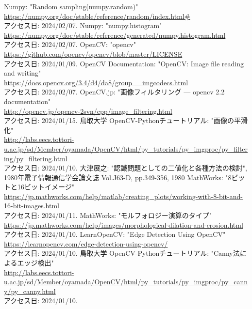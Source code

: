 \documentclass[uplatex, report, a4j, 10pt]{jsbook}
\begin{document}
\begin{thebibliography}{0}
  Numpy: "Random sampling(numpy.random)"\\\url{https://numpy.org/doc/stable/reference/random/index.html#}\\アクセス日: 2024/02/07.
  Numpy: "numpy.histogram"\\\url{https://numpy.org/doc/stable/reference/generated/numpy.histogram.html}\\アクセス日: 2024/02/07.
  OpenCV: "opencv"\\\url{https://github.com/opencv/opencv/blob/master/LICENSE}\\アクセス日: 2024/01/09.
  OpenCV Documentation: "OpenCV: Image file reading and writing" \\\url{https://docs.opencv.org/3.4/d4/da8/group__imgcodecs.html}\\アクセス日: 2024/02/07.
  OpenCV.jp: "画像フィルタリング — opencv 2.2 documentation"\\\url{http://opencv.jp/opencv-2svn/cpp/image_filtering.html}\\アクセス日: 2024/01/15.
  鳥取大学 OpenCV-Pythonチュートリアル: "画像の平滑化"\\\url{http://labs.eecs.tottori-u.ac.jp/sd/Member/oyamada/OpenCV/html/py_tutorials/py_imgproc/py_filtering/py_filtering.html}\\アクセス日: 2024/01/10.
  大津展之: "認識問題としての二値化と各種方法の検討", 1980年電子情報通信学会論文誌 Vol.J63-D, pp.349-356, 1980
  MathWorks: "8ビットと16ビットイメージ"\\\url{https://jp.mathworks.com/help/matlab/creating_plots/working-with-8-bit-and-16-bit-images.html}\\アクセス日: 2024/01/11.
  MathWorks: "モルフォロジー演算のタイプ"\\\url{https://jp.mathworks.com/help/images/morphological-dilation-and-erosion.html}\\アクセス日: 2024/01/10.
  LearnOpenCV: "Edge Detection Using OpenCV"\\\url{https://learnopencv.com/edge-detection-using-opencv/}\\アクセス日: 2024/01/10.
  鳥取大学 OpenCV-Pythonチュートリアル: "Canny法によるエッジ検出"\\\url{http://labs.eecs.tottori-u.ac.jp/sd/Member/oyamada/OpenCV/html/py_tutorials/py_imgproc/py_canny/py_canny.html}\\アクセス日: 2024/01/10.

\end{thebibliography}
\end{document}
